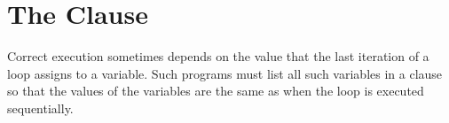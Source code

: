 \pagebreak
\section{The  Clause}
\label{sec:lastprivate}

Correct execution sometimes depends on the value that the last iteration of a loop 
assigns to a variable. Such programs must list all such variables in a  
clause  so that the values of the variables are the same as when the loop is executed 
sequentially.




